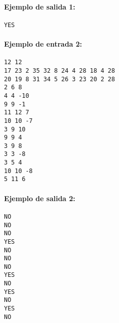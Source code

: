 \hypertarget{ejemplo-de-salida-1}{%
\paragraph{Ejemplo de salida 1:}\label{ejemplo-de-salida-1}}

\begin{verbatim}
YES
\end{verbatim}

\hypertarget{ejemplo-de-entrada-2}{%
\paragraph{Ejemplo de entrada 2:}\label{ejemplo-de-entrada-2}}

\begin{verbatim}
12 12
17 23 2 35 32 8 24 4 28 18 4 28
20 19 8 31 34 5 26 3 23 20 2 28
2 6 8
4 4 -10
9 9 -1
11 12 7
10 10 -7
3 9 10
9 9 4
3 9 8
3 3 -8
3 5 4
10 10 -8
5 11 6
\end{verbatim}

\hypertarget{ejemplo-de-salida-2}{%
\paragraph{Ejemplo de salida 2:}\label{ejemplo-de-salida-2}}

\begin{verbatim}
NO
NO
NO
YES
NO
NO
NO
YES
NO
YES
NO
YES
NO
\end{verbatim}
